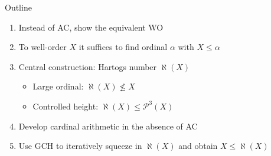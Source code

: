 \documentclass[xcolor=dvipsnames,compress,aspectratio=169,handout]{beamer}
\newcommand{\MBB}[1]{\ensuremath{\mathbb{#1}}\xspace}  %
\newcommand{\MCL}[1]{\ensuremath{\mathcal{#1}}\xspace} %
\newcommand{\Nat}{\MBB{N}}   %
\newcommand{\Pow}{\MCL P}
\newcommand{\hartogsNumber}{\aleph}
\begin{document}
\begin{frame}{Outline}
	\begin{enumerate}[<+->]
			\item
			Instead of AC, show the equivalent WO
			\vspace{0.4cm}
			\item
			To well-order $X$ it suffices to find ordinal $\alpha$ with $X\le \alpha$
			\vspace{0.4cm}
			\item
			Central construction: Hartogs number $\hartogsNumber(X)$
			\begin{itemize}
				\item
				\vspace{0.2cm}
				Large ordinal: $\hartogsNumber(X)\not\le X$
				\vspace{0.2cm}
				\item
				Controlled height: $\hartogsNumber(X)\le\Pow^3(X)$
			\end{itemize}
			\vspace{0.4cm}
			\item
			Develop cardinal arithmetic in the absence of AC
			\vspace{0.4cm}
			\item
			Use GCH to iteratively squeeze in $\hartogsNumber(X)$ and obtain $X\le \hartogsNumber(X)$
		\end{enumerate}
\end{frame}
\end{document}
